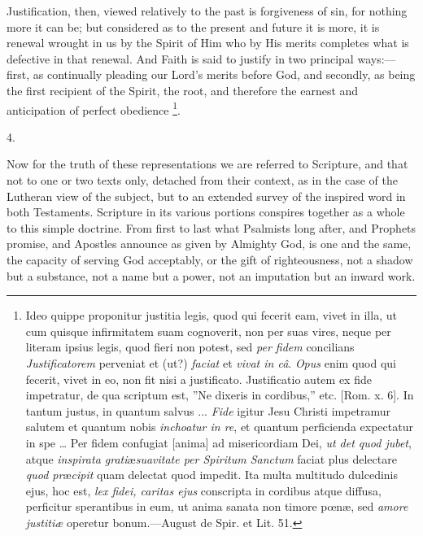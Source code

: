 Justification, then, viewed relatively to the past is forgiveness
of sin, for nothing more it can be; but considered as to the present
and future it is more, it is renewal wrought in us by the Spirit of
Him who by His merits completes what is defective in that renewal. And
Faith is said to justify in two principal ways:—first, as
continually pleading our Lord's merits before God, and secondly, as
being the first recipient of the Spirit, the root, and therefore the
earnest and anticipation of perfect obedience \footnote{Ideo quippe
proponitur justitia legis, quod qui fecerit eam, vivet in illa, ut cum
quisque infirmitatem suam cognoverit, non per suas vires, neque per
literam ipsius legis, quod fieri non potest, sed \emph{per fidem}
concilians \emph{Justificatorem} perveniat et (ut?) \emph{faciat} et \emph{vivat
in câ}. \emph{Opus} enim quod qui fecerit, vivet in eo, non fit
nisi a justificato. Justificatio autem ex fide impetratur, de qua
scriptum est, ''Ne dixeris in cordibus,'' etc. [Rom. x. 6]. In
tantum justus, in quantum salvus ... \emph{Fide} igitur Jesu Christi
impetramur salutem et quantum nobis \emph{inchoatur in re}, et quantum
perficienda expectatur in spe … Per fidem confugiat [anima] ad
misericordiam Dei, \emph{ut det quod jubet}, atque \emph{inspirata grati}æ\emph{suavitate per Spiritum Sanctum} faciat plus delectare \emph{quod
pr}æ\emph{cipit} quam delectat quod impedit. Ita multa multitudo
dulcedinis ejus, hoc est, \emph{lex fidei, caritas ejus} conscripta in
cordibus atque diffusa, perficitur sperantibus in eum, ut anima sanata
non timore pœnæ, sed \emph{amore justitiæ} operetur bonum.—August
de Spir. et Lit. 51.}.

4.

Now for the truth of these representations we are referred to
Scripture, and that not to one or two texts only, detached from
their context, as in the case of the Lutheran view of the subject, but
to an extended survey of the inspired word in both Testaments.
Scripture in its various portions conspires together as a whole to
this simple doctrine. From first to last what Psalmists long after,
and Prophets promise, and Apostles announce as given by Almighty God,
is one and the same, the capacity of serving God acceptably, or the
gift of righteousness, not a shadow but a substance, not a name but a
power, not an imputation but an inward work.

